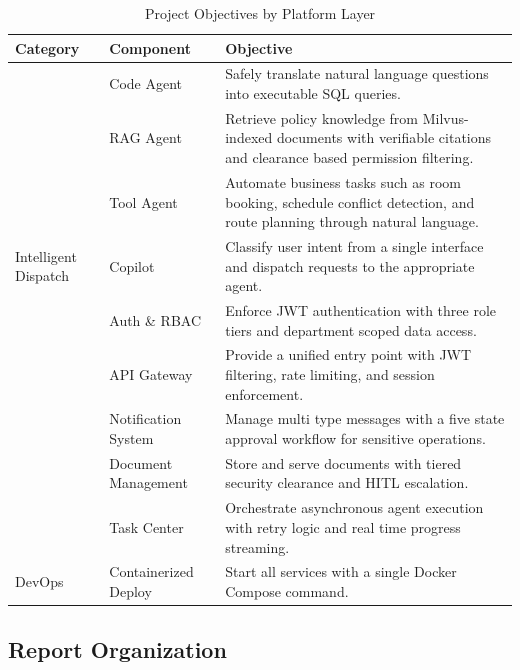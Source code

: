 \begin{table}[H]
\centering
\small\singlespacing
\caption{Project Objectives by Platform Layer}
\label{tab:objectives}
\begin{tabularx}{\textwidth}{>{\RaggedRight\arraybackslash}p{}>{\RaggedRight\arraybackslash}p{}>{\RaggedRight\arraybackslash}X}
\toprule
\textbf{Category} & \textbf{Component} & \textbf{Objective} \\
\midrule
\multirow{3}{*}{AI Agents} & Code Agent & Safely translate natural language questions into executable SQL queries. \\
\cmidrule{2-3}
 & RAG Agent & Retrieve policy knowledge from Milvus-indexed documents with verifiable citations and clearance based permission filtering. \\
\cmidrule{2-3}
 & Tool Agent & Automate business tasks such as room booking, schedule conflict detection, and route planning through natural language. \\
\addlinespace
Intelligent Dispatch & Copilot & Classify user intent from a single interface and dispatch requests to the appropriate agent. \\
\addlinespace
\multirow{5}{*}{Platform Services} & Auth \& RBAC & Enforce JWT authentication with three role tiers and department scoped data access. \\
\cmidrule{2-3}
 & API Gateway & Provide a unified entry point with JWT filtering, rate limiting, and session enforcement. \\
\cmidrule{2-3}
 & Notification System & Manage multi type messages with a five state approval workflow for sensitive operations. \\
\cmidrule{2-3}
 & Document Management & Store and serve documents with tiered security clearance and HITL escalation. \\
\cmidrule{2-3}
 & Task Center & Orchestrate asynchronous agent execution with retry logic and real time progress streaming. \\
\addlinespace
DevOps & Containerized Deploy & Start all services with a single Docker Compose command. \\
\bottomrule
\end{tabularx}
\end{table}

\subsection{Report Organization}

